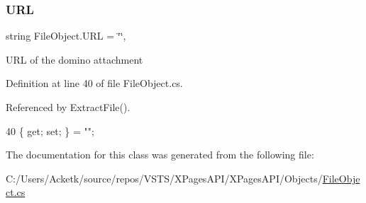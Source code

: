 \subsubsection{\texorpdfstring{U\+RL}{URL}}
{\footnotesize\ttfamily string File\+Object.\+U\+RL = \char`\"{}\char`\"{}\hspace{0.3cm}{\ttfamily [get]}, {\ttfamily [set]}}



U\+RL of the domino attachment 



Definition at line 40 of file File\+Object.\+cs.



Referenced by Extract\+File().


\begin{DoxyCode}
40 \{ \textcolor{keyword}{get}; \textcolor{keyword}{set}; \} = \textcolor{stringliteral}{""};
\end{DoxyCode}


The documentation for this class was generated from the following file\+:\begin{DoxyCompactItemize}
\item 
C\+:/\+Users/\+Acketk/source/repos/\+V\+S\+T\+S/\+X\+Pages\+A\+P\+I/\+X\+Pages\+A\+P\+I/\+Objects/\mbox{\hyperlink{_file_object_8cs}{File\+Object.\+cs}}\end{DoxyCompactItemize}
